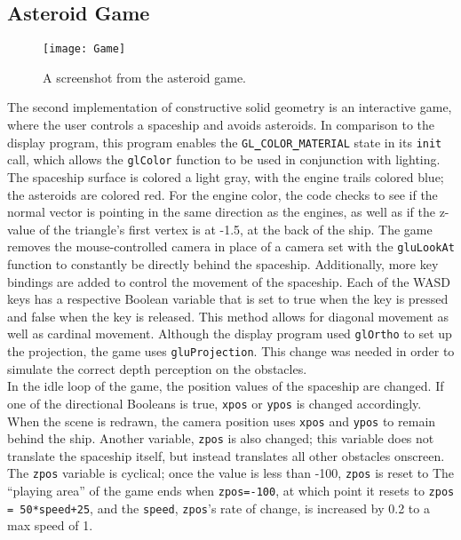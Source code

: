 \documentclass[12pt]{article}
\begin{document}
\begin{doublespace}
\subsection{Asteroid Game}
\begin{figure}[h]
  \texttt{[image: Game]}
  \centering
  \caption{A screenshot from the asteroid game.}
\end{figure}
The second implementation of constructive solid geometry is an interactive game, where the user controls a spaceship and avoids asteroids. In comparison to the display program, this program enables the \texttt{GL{\bf\_}COLOR{\bf\_}MATERIAL} state in its \texttt{init} call, which allows the \texttt{glColor} function to be used in conjunction with lighting. The spaceship surface is colored a light gray, with the engine trails colored blue; the asteroids are colored red. For the engine color, the code checks to see if the normal vector is pointing in the same direction as the engines, as well as if the z-value of the triangle's first vertex is at -1.5, at the back of the ship. The game removes the mouse-controlled camera in place of a camera set with the \texttt{gluLookAt} function to constantly be directly behind the spaceship. Additionally, more key bindings are added to control the movement of the spaceship. Each of the WASD keys has a respective Boolean variable that is set to true when the key is pressed and false when the key is released. This method allows for diagonal movement as well as cardinal movement. Although the display program used \texttt{glOrtho} to set up the projection, the game uses \texttt{gluProjection}. This change was needed in order to simulate the correct depth perception on the obstacles.\\

In the idle loop of the game, the position values of the spaceship are changed. If one of the directional Booleans is true, \texttt{xpos} or \texttt{ypos} is changed accordingly. When the scene is redrawn, the camera position uses \texttt{xpos} and \texttt{ypos} to remain behind the ship. Another variable, \texttt{zpos} is also changed; this variable does not translate the spaceship itself, but instead translates all other obstacles onscreen. The \texttt{zpos} variable is cyclical; once the value is less than -100, \texttt{zpos} is reset to The ``playing area'' of the game ends when \texttt{zpos=-100}, at which point it resets to \texttt{zpos = 50*speed+25}, and the \texttt{speed}, \texttt{zpos}'s rate of change, is increased by 0.2 to a max speed of 1.\\


\end{doublespace}
\end{document}
